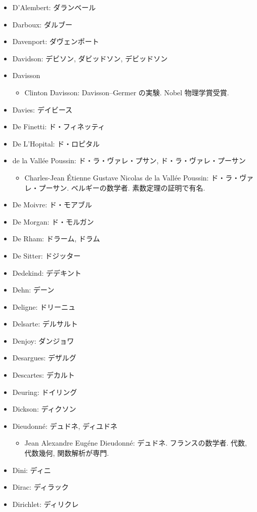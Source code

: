 \documentclass[openany, a4paper, oneside]{jsbook}
\begin{document}
\begin{itemize}
\item D'Alembert: ダランベール
\item Darboux: ダルブー
\item Davenport: ダヴェンポート
\item Davidson: デビソン, ダビッドソン, デビッドソン
\item Davisson
\begin{itemize}
\item Clinton Davisson: Davisson–Germer の実験. Nobel 物理学賞受賞.
\end{itemize}
\item Davies: デイビース
\item De Finetti: ド・フィネッティ
\item De L'Hopital: ド・ロピタル
\item de la Vall\'ee Poussin: ド・ラ・ヴァレ・プサン, ド・ラ・ヴァレ・プーサン
\begin{itemize}
\item Charles-Jean \'Etienne Gustave Nicolas de la Vallée Poussin: ド・ラ・ヴァレ・プーサン. ベルギーの数学者. 素数定理の証明で有名.
\end{itemize}
\item De Moivre: ド・モアブル
\item De Morgan: ド・モルガン
\item De Rham: ドラーム, ドラム
\item De Sitter: ドジッター
\item Dedekind: デデキント
\item Dehn: デーン
\item Deligne: ドリーニュ
\item Delsarte: デルサルト
\item Denjoy: ダンジョワ
\item Desargues: デザルグ
\item Descartes: デカルト
\item Deuring: ドイリング
\item Dickson: ディクソン
\item Dieudonn\'e: デュドネ, ディユドネ
\begin{itemize}
\item Jean Alexandre Eug\'ene Dieudonn\'e: デュドネ. フランスの数学者. 代数, 代数幾何, 関数解析が専門.
\end{itemize}
\item Dini: ディニ
\item Dirac: ディラック
\item Dirichlet: ディリクレ

\end{itemize}
\end{document}
